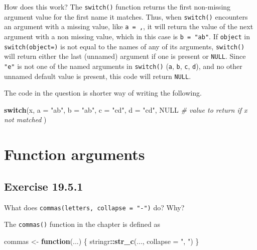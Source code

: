 \documentclass[]{book}
\newenvironment{Shaded}{\begin{snugshade}}{\end{snugshade}}
\newcommand{\CommentTok}[1]{\textcolor[rgb]{0.56,0.35,0.01}{\textit{#1}}}
\newcommand{\ControlFlowTok}[1]{\textcolor[rgb]{0.13,0.29,0.53}{\textbf{#1}}}
\newcommand{\DataTypeTok}[1]{\textcolor[rgb]{0.13,0.29,0.53}{#1}}
\newcommand{\KeywordTok}[1]{\textcolor[rgb]{0.13,0.29,0.53}{\textbf{#1}}}
\newcommand{\NormalTok}[1]{#1}
\newcommand{\OperatorTok}[1]{\textcolor[rgb]{0.81,0.36,0.00}{\textbf{#1}}}
\newcommand{\OtherTok}[1]{\textcolor[rgb]{0.56,0.35,0.01}{#1}}
\newcommand{\StringTok}[1]{\textcolor[rgb]{0.31,0.60,0.02}{#1}}
\theoremstyle{plain}
\theoremstyle{remark}
\begin{document}
How does this work? The \texttt{switch()} function returns the first
non-missing argument value for the first name it matches. Thus, when
\texttt{switch()} encounters an argument with a missing value, like
\texttt{a\ =\ ,}, it will return the value of the next argument with a
non missing value, which in this case is \texttt{b\ =\ "ab"}. If
\texttt{object} in \texttt{switch(object=)} is not equal to the names of
any of its arguments, \texttt{switch()} will return either the last
(unnamed) argument if one is present or \texttt{NULL}. Since
\texttt{"e"} is not one of the named arguments in \texttt{switch()}
(\texttt{a}, \texttt{b}, \texttt{c}, \texttt{d}), and no other unnamed
default value is present, this code will return \texttt{NULL}.

The code in the question is shorter way of writing the following.

\begin{Shaded}
\begin{Highlighting}[]
\ControlFlowTok{switch}\NormalTok{(x,}
  \DataTypeTok{a =} \StringTok{"ab"}\NormalTok{,}
  \DataTypeTok{b =} \StringTok{"ab"}\NormalTok{,}
  \DataTypeTok{c =} \StringTok{"cd"}\NormalTok{,}
  \DataTypeTok{d =} \StringTok{"cd"}\NormalTok{,}
  \OtherTok{NULL}  \CommentTok{# value to return if x not matched}
\NormalTok{)}
\end{Highlighting}
\end{Shaded}

\hypertarget{function-arguments}{%
\section{Function arguments}\label{function-arguments}}

\hypertarget{exercise-19.5.1}{%
\subsection*{\texorpdfstring{Exercise
{19.5.1}}{Exercise 19.5.1}}\label{exercise-19.5.1}}

What does \texttt{commas(letters,\ collapse\ =\ "-")} do? Why?

The \texttt{commas()} function in the chapter is defined as

\begin{Shaded}
\begin{Highlighting}[]
\NormalTok{commas <-}\StringTok{ }\ControlFlowTok{function}\NormalTok{(...) \{}
\NormalTok{  stringr}\OperatorTok{::}\KeywordTok{str_c}\NormalTok{(..., }\DataTypeTok{collapse =} \StringTok{", "}\NormalTok{)}
\NormalTok{\}}
\end{Highlighting}
\end{Shaded}
\end{document}
